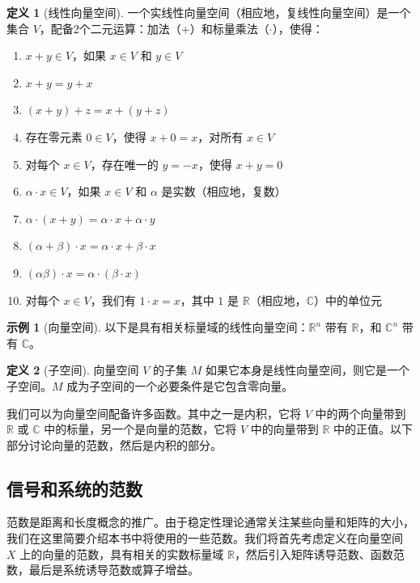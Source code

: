 \documentclass[UTF8,12pt,a4paper]{ctexart}
\theoremstyle{definition}
\newtheorem{definition}{定义}[section]
\newtheorem{example}{示例}[section]
\begin{document}
\begin{definition}[线性向量空间]
一个实线性向量空间（相应地，复线性向量空间）是一个集合 $V$，配备2个二元运算：加法（+）和标量乘法（$\cdot$），使得：
\begin{enumerate}
\item $x+y \in V$，如果 $x \in V$ 和 $y \in V$
\item $x+y = y+x$
\item $(x+y)+z = x+(y+z)$
\item 存在零元素 $0 \in V$，使得 $x+0=x$，对所有 $x \in V$
\item 对每个 $x \in V$，存在唯一的 $y=-x$，使得 $x+y=0$
\item $\alpha \cdot x \in V$，如果 $x \in V$ 和 $\alpha$ 是实数（相应地，复数）
\item $\alpha \cdot (x+y) = \alpha \cdot x + \alpha \cdot y$
\item $(\alpha + \beta) \cdot x = \alpha \cdot x + \beta \cdot x$
\item $(\alpha \beta) \cdot x = \alpha \cdot (\beta \cdot x)$
\item 对每个 $x \in V$，我们有 $1 \cdot x = x$，其中 $1$ 是 $\mathbb{R}$（相应地，$\mathbb{C}$）中的单位元
\end{enumerate}
\end{definition}

\begin{example}[向量空间]
以下是具有相关标量域的线性向量空间：$\mathbb{R}^n$ 带有 $\mathbb{R}$，和 $\mathbb{C}^n$ 带有 $\mathbb{C}$。
\end{example}

\begin{definition}[子空间]
向量空间 $V$ 的子集 $M$ 如果它本身是线性向量空间，则它是一个子空间。$M$ 成为子空间的一个必要条件是它包含零向量。
\end{definition}

我们可以为向量空间配备许多函数。其中之一是内积，它将 $V$ 中的两个向量带到 $\mathbb{R}$ 或 $\mathbb{C}$ 中的标量，另一个是向量的范数，它将 $V$ 中的向量带到 $\mathbb{R}$ 中的正值。以下部分讨论向量的范数，然后是内积的部分。

\subsection{信号和系统的范数}

范数是距离和长度概念的推广。由于稳定性理论通常关注某些向量和矩阵的大小，我们在这里简要介绍本书中将使用的一些范数。我们将首先考虑定义在向量空间 $X$ 上的向量的范数，具有相关的实数标量域 $\mathbb{R}$，然后引入矩阵诱导范数、函数范数，最后是系统诱导范数或算子增益。
\end{document}

